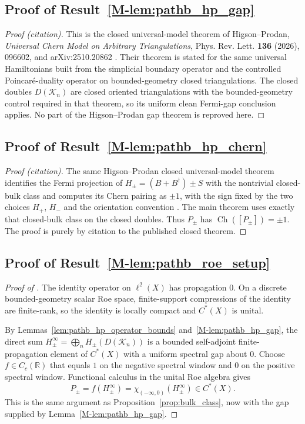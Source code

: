 \documentclass[11pt]{article}
\numberwithin{equation}{section}
\theoremstyle{definition}
\theoremstyle{remark}
\newcommand{\K}{\mathcal{K}}
\newcommand{\Ch}{\operatorname{Ch}}
\begin{document}
\subsection{Proof of Result~\ref{M-lem:pathb_hp_gap}}\label{app:proof:lem:pathb_hp_gap}
\begin{proof}[Proof (citation)]
This is the closed universal-model theorem of Higson--Prodan,
\emph{Universal Chern Model on Arbitrary Triangulations}, Phys. Rev. Lett. \textbf{136} (2026),
096602, and arXiv:2510.20862 \cite{HigsonProdanUniversalPRL,HigsonProdanUniversalArxiv}. Their
theorem is stated for the same universal Hamiltonians built from the simplicial boundary operator
and the controlled Poincar\'e-duality operator on bounded-geometry closed triangulations. The closed
doubles \(D(\K_n)\) are closed oriented triangulations with the bounded-geometry
control required in that theorem, so its uniform clean Fermi-gap conclusion applies. No part of the
Higson--Prodan gap theorem is reproved here.
\end{proof}

\subsection{Proof of Result~\ref{M-lem:pathb_hp_chern}}\label{app:proof:lem:pathb_hp_chern}
\begin{proof}[Proof (citation)]
The same Higson--Prodan closed universal-model theorem identifies the Fermi projection of
\(H_\pm=(B+B^\dagger)\pm S\) with the nontrivial closed-bulk class and computes its Chern pairing as
\(\pm1\), with the sign fixed by the two choices \(H_+\), \(H_-\) and the orientation convention
\cite{HigsonProdanUniversalPRL,HigsonProdanUniversalArxiv}. The main theorem uses exactly that
closed-bulk class on the closed doubles. Thus \(P_\pm\) has \(\Ch([P_\pm])=\pm1\). The proof is purely by
citation to the published closed theorem.
\end{proof}

\subsection{Proof of Result~\ref{M-lem:pathb_roe_setup}}\label{app:proof:lem:pathb_roe_setup}
\begin{proof}[Proof of ]
The identity operator on \(\ell^2(X)\) has propagation \(0\). On a discrete bounded-geometry scalar
Roe space, finite-support compressions of the identity are finite-rank, so the identity is locally
compact and \(C^*(X)\) is unital.

By Lemmas~\ref{lem:pathb_hp_operator_bounds} and~\ref{M-lem:pathb_hp_gap}, the direct sum
\(H_\pm^\infty=\bigoplus_n H_\pm(D(\K_n))\) is a bounded self-adjoint finite-propagation element of
\(C^*(X)\) with a uniform spectral gap about \(0\). Choose \(f\in C_c(\mathbb R)\) that equals
\(1\) on the negative spectral window and \(0\) on the positive spectral window. Functional calculus
in the unital Roe algebra gives
\[
P_\pm=f(H_\pm^\infty)=\chi_{(-\infty,0)}(H_\pm^\infty)\in C^*(X).
\]
This is the same argument as Proposition~\ref{prop:bulk_class}, now with the gap supplied by
Lemma~\ref{M-lem:pathb_hp_gap}.
\end{proof}
\end{document}
